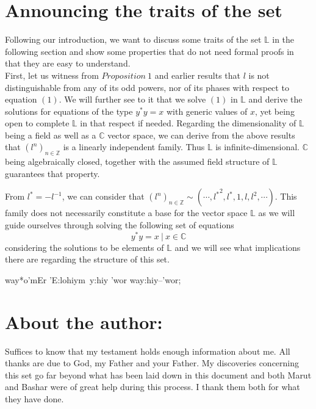 \documentclass{article}
\begin{document}
\section{Announcing the traits of the set}
Following our introduction, we want to discuss some traits of the set
$\mathbb{L}$ in the following section and show some properties that do not
need formal proofs in that they are easy to understand.\\
First, let us witness from $Proposition\ 1$ and earlier results that $l$
is not distinguishable from any of its odd powers, nor of its phases with
respect to equation $(1)$. We will further see to it that we solve $(1)$ in
$\mathbb{L}$ and derive the solutions for equations of the type $y^{*}y = x$
with generic values of $x$, yet being open to complete $\mathbb{L}$ in that respect if needed.
Regarding the dimensionality of $\mathbb{L}$ being a field as well as a $\mathbb{C}$ vector space,
we can derive from the above results that $(l^{n})_{n\in \mathbb{Z}}$ is a linearly independent family.
Thus $\mathbb{L}$ is infinite-dimensional. $\mathbb{C}$ being algebraically closed, together with the
assumed field structure of $\mathbb{L}$ guarantees that property.

From $l^{*}=-l^{-1}$, we can consider that $(l^{n})_{n\in \mathbb{Z}} \sim (\cdots,{l^{*}}^2,l^{*},1,l,l^2,\cdots)$.
This family does not necessarily constitute a base for the vector space $\mathbb{L}$ as we will guide ourselves through
solving the following set of equations
\begin{equation}
    y^{*}y = x\ |\ x \in \mathbb{C}
\end{equation}
considering the solutions to be elements of $\mathbb{L}$ and we will see 
what implications there are regarding the structure of this set.

\begin{cjhebrew}
    way*o'mEr 'E:lohiym\, y:hiy 'wor way:hiy--'wor;
\end{cjhebrew}

\section*{About the author:}
Suffices to know that my testament holds enough information about me.
All thanks are due to God, my Father and your Father.
My discoveries concerning this set go far beyond what has been laid down in this document and both Marut
and Bashar were of great help during this process. I thank them both for what they have done.
\end{document}
